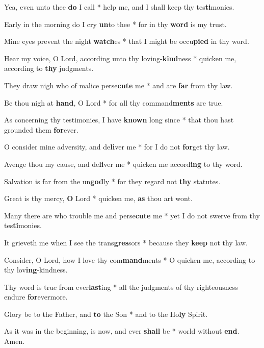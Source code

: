 \begin{multicols}{2}
	Yea, even unto thee \textbf{do} I call * help me, and I shall keep thy tes\textbf{ti}monies.
	
	Early in the morning do I cry \textbf{un}to thee * for in thy \textbf{word} is my trust.
	
	Mine eyes prevent the night \textbf{watch}es * that I might be occu\textbf{pied} in thy word.
	
	Hear my voice, O Lord, according unto thy loving-\textbf{kind}ness * quicken me, according to \textbf{thy} judgments.
	
	They draw nigh who of malice perse\textbf{cute} me * and are \textbf{far} from thy law.
	
	Be thou nigh at \textbf{hand}, O Lord * for all thy command\textbf{ments} are true.
	
	As concerning thy testimonies, I have \textbf{known} long since * that thou hast grounded them \textbf{for}ever.
	
	O consider mine adversity, and de\textbf{li}ver me * for I do not \textbf{for}get thy law.
	
	Avenge thou my cause, and de\textbf{li}ver me * quicken me accord\textbf{ing} to thy word.
	
	Salvation is far from the un\textbf{god}ly * for they regard not \textbf{thy} statutes.
	
	Great is thy mercy, \textbf{O} Lord * quicken me, \textbf{as} thou art wont.
	
	Many there are who trouble me and perse\textbf{cute} me * yet I do not swerve from thy tes\textbf{ti}monies.
	
	It grieveth me when I see the trans\textbf{gres}sors * because they \textbf{keep} not thy law.
	
	Consider, O Lord, how I love thy com\textbf{mand}ments * O quicken me, according to thy lov\textbf{ing}-kindness.
	
	Thy word is true from ever\textbf{last}ing * all the judgments of thy righteousness endure \textbf{for}evermore.
	
	Glory be to the Father, and \textbf{to} the Son * and to the Ho\textbf{ly} Spirit.
	
	As it was in the beginning, is now, and ever \textbf{shall} be * world without \textbf{end}. Amen.
\end{multicols}